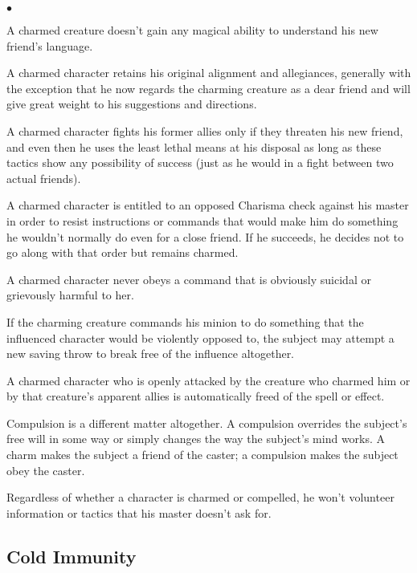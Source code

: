 \begin{list}{$\bullet$}{\itemspace}
	\item A charmed creature doesn't gain any magical ability to understand his new friend's language.
	\item A charmed character retains his original alignment and allegiances, generally with the exception that he now regards the charming creature as a dear friend and will give great weight to his suggestions and directions.
	\item A charmed character fights his former allies only if they threaten his new friend, and even then he uses the least lethal means at his disposal as long as these tactics show any possibility of success (just as he would in a fight between two actual friends).
	\item A charmed character is entitled to an opposed Charisma check against his master in order to resist instructions or commands that would make him do something he wouldn't normally do even for a close friend. If he succeeds, he decides not to go along with that order but remains charmed.
	\item A charmed character never obeys a command that is obviously suicidal or grievously harmful to her.
	\item If the charming creature commands his minion to do something that the influenced character would be violently opposed to, the subject may attempt a new saving throw to break free of the influence altogether.
	\item A charmed character who is openly attacked by the creature who charmed him or by that creature's apparent allies is automatically freed of the spell or effect.
\end{list}

\vspace*{10pt}

Compulsion is a different matter altogether. A compulsion overrides the subject's free will in some way or simply changes the way the subject's mind works. A charm makes the subject a friend of the caster; a compulsion makes the subject obey the caster.

Regardless of whether a character is charmed or compelled, he won't volunteer information or tactics that his master doesn't ask for.

\subsection{Cold Immunity}

